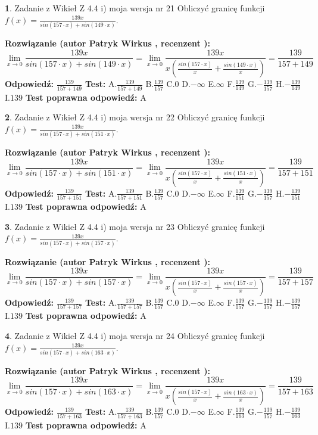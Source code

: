 \documentclass[12pt, a4paper]{article}
\theoremstyle{definition} %
\newtheorem{zad}{}
\newcommand{\zadStart}[1]{\begin{zad}#1\newline}
\newcommand{\zadStop}{\end{zad}}
\newcommand{\rozwStart}[2]{\noindent \textbf{Rozwiązanie (autor #1 , recenzent #2): }\newline}
\newcommand{\rozwStop}{\newline}
\newcommand{\odpStart}{\noindent \textbf{Odpowiedź:}\newline}
\newcommand{\odpStop}{\newline}
\newcommand{\testStart}{\noindent \textbf{Test:}\newline}
\newcommand{\testStop}{\newline}
\newcommand{\kluczStart}{\noindent \textbf{Test poprawna odpowiedź:}\newline}
\newcommand{\kluczStop}{\newline}
\begin{document}
\zadStart{Zadanie z Wikieł Z 4.4 i) moja wersja nr 21}
Obliczyć granicę funkcji $f(x)=\frac{139x}{sin(157\cdot x) +sin(149\cdot x)}$.
\zadStop
\rozwStart{Patryk Wirkus}{}
$$\lim\limits_{x\to 0}\frac{139x}{sin(157\cdot x) +sin(149\cdot x)}=\lim\limits_{x\to 0}\frac{139x}{x(\frac{sin(157\cdot x)}{x}+\frac{sin(149\cdot x)}{x})}=\frac{139}{157+149}$$
\rozwStop
\odpStart
$\frac{139}{157+149}$
\odpStop
\testStart
A.$\frac{139}{157+149}$
B.$\frac{139}{157}$
C.$0$
D.$-\infty$
E.$\infty$
F.$\frac{139}{149}$
G.$-\frac{139}{157}$
H.$-\frac{139}{149}$
I.$139$
\testStop
\kluczStart
A
\kluczStop



\zadStart{Zadanie z Wikieł Z 4.4 i) moja wersja nr 22}
Obliczyć granicę funkcji $f(x)=\frac{139x}{sin(157\cdot x) +sin(151\cdot x)}$.
\zadStop
\rozwStart{Patryk Wirkus}{}
$$\lim\limits_{x\to 0}\frac{139x}{sin(157\cdot x) +sin(151\cdot x)}=\lim\limits_{x\to 0}\frac{139x}{x(\frac{sin(157\cdot x)}{x}+\frac{sin(151\cdot x)}{x})}=\frac{139}{157+151}$$
\rozwStop
\odpStart
$\frac{139}{157+151}$
\odpStop
\testStart
A.$\frac{139}{157+151}$
B.$\frac{139}{157}$
C.$0$
D.$-\infty$
E.$\infty$
F.$\frac{139}{151}$
G.$-\frac{139}{157}$
H.$-\frac{139}{151}$
I.$139$
\testStop
\kluczStart
A
\kluczStop



\zadStart{Zadanie z Wikieł Z 4.4 i) moja wersja nr 23}
Obliczyć granicę funkcji $f(x)=\frac{139x}{sin(157\cdot x) +sin(157\cdot x)}$.
\zadStop
\rozwStart{Patryk Wirkus}{}
$$\lim\limits_{x\to 0}\frac{139x}{sin(157\cdot x) +sin(157\cdot x)}=\lim\limits_{x\to 0}\frac{139x}{x(\frac{sin(157\cdot x)}{x}+\frac{sin(157\cdot x)}{x})}=\frac{139}{157+157}$$
\rozwStop
\odpStart
$\frac{139}{157+157}$
\odpStop
\testStart
A.$\frac{139}{157+157}$
B.$\frac{139}{157}$
C.$0$
D.$-\infty$
E.$\infty$
F.$\frac{139}{157}$
G.$-\frac{139}{157}$
H.$-\frac{139}{157}$
I.$139$
\testStop
\kluczStart
A
\kluczStop



\zadStart{Zadanie z Wikieł Z 4.4 i) moja wersja nr 24}
Obliczyć granicę funkcji $f(x)=\frac{139x}{sin(157\cdot x) +sin(163\cdot x)}$.
\zadStop
\rozwStart{Patryk Wirkus}{}
$$\lim\limits_{x\to 0}\frac{139x}{sin(157\cdot x) +sin(163\cdot x)}=\lim\limits_{x\to 0}\frac{139x}{x(\frac{sin(157\cdot x)}{x}+\frac{sin(163\cdot x)}{x})}=\frac{139}{157+163}$$
\rozwStop
\odpStart
$\frac{139}{157+163}$
\odpStop
\testStart
A.$\frac{139}{157+163}$
B.$\frac{139}{157}$
C.$0$
D.$-\infty$
E.$\infty$
F.$\frac{139}{163}$
G.$-\frac{139}{157}$
H.$-\frac{139}{163}$
I.$139$
\testStop
\kluczStart
A
\kluczStop
\end{document}
